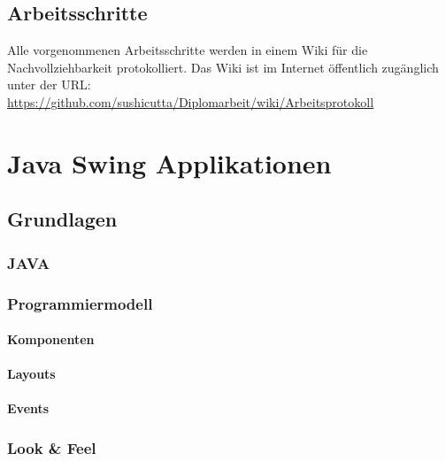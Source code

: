 \documentclass[abstracton, listof=totocnumbered,
bibliography=totocnumbered]{scrreprt}
\begin{document}
  \section{Arbeitsschritte}
  
  Alle vorgenommenen Arbeitsschritte werden in einem Wiki für die
  Nachvollziehbarkeit protokolliert. Das Wiki ist im Internet öffentlich
  zugänglich unter der URL:
  \url{https://github.com/sushicutta/Diplomarbeit/wiki/Arbeitsprotokoll}
  
  \newpage
  
  
  \chapter{Java Swing Applikationen}

  \section{Grundlagen}
  
  \subsection{JAVA}
  
  \subsection{Programmiermodell}
  
  \subsubsection{Komponenten}
  
  \subsubsection{Layouts}
    
  \subsubsection{Events}
  
  \subsection{Look \& Feel}
  
\end{document}
